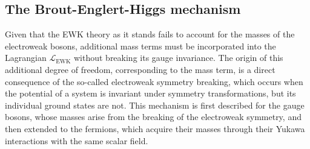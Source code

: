 \subsection{The Brout-Englert-Higgs mechanism}
\label{subsec:BEH}
%
Given that the EWK theory as it stands fails to account for the masses of the electroweak bosons, additional mass terms must be incorporated into the Lagrangian $\mathcal{L}_{\text{EWK}}$ without breaking its gauge invariance. The origin of this additional degree of freedom, corresponding to the mass term, is a direct consequence of the so-called electroweak symmetry breaking, which occurs when the potential of a system is invariant under symmetry transformations, but its individual ground states are not. This mechanism is first described for the gauge bosons, whose masses arise from the breaking of the electroweak symmetry, and then extended to the fermions, which acquire their masses through their Yukawa interactions with the same scalar field.


